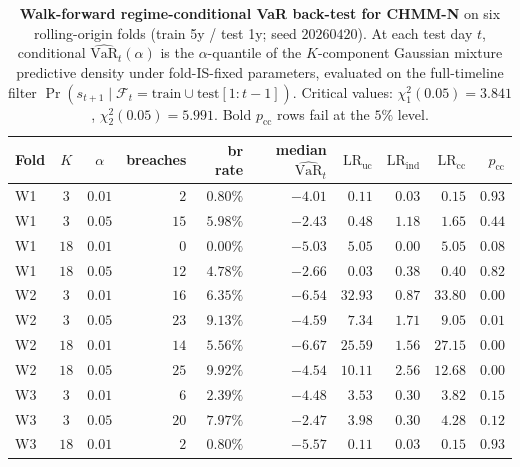 \begin{table}[!ht]
\centering
\small
\caption{\textbf{Walk-forward regime-conditional VaR back-test for CHMM-N} on six rolling-origin folds (train 5y / test 1y; seed $20260420$). At each test day $t$, conditional $\widehat{\text{VaR}}_t(\alpha)$ is the $\alpha$-quantile of the $K$-component Gaussian mixture predictive density under fold-IS-fixed parameters, evaluated on the full-timeline filter $\Pr(s_{t+1} \mid \mathcal F_t = \text{train} \cup \text{test}[1{:}t-1])$. Critical values: $\chi^2_1(0.05) = 3.841$, $\chi^2_2(0.05) = 5.991$. Bold $p_{\text{cc}}$ rows fail at the $5\%$ level.}
\label{tab:walkforward_cond_var}
\begin{tabular}{l c c r r r r r r r}
\toprule
Fold & $K$ & $\alpha$ & breaches & br rate & median $\widehat{\text{VaR}}_t$ & $\text{LR}_{\text{uc}}$ & $\text{LR}_{\text{ind}}$ & $\text{LR}_{\text{cc}}$ & $p_{\text{cc}}$ \\
\midrule
W1 & $3$  & $0.01$ & $\phantom{0}2$ & $0.80\%$ & $-4.01$ & $\phantom{0}0.11$ & $0.03$ & $\phantom{0}0.15$ & $0.93$ \\
W1 & $3$  & $0.05$ & $15$           & $5.98\%$ & $-2.43$ & $\phantom{0}0.48$ & $1.18$ & $\phantom{0}1.65$ & $0.44$ \\
W1 & $18$ & $0.01$ & $\phantom{0}0$ & $0.00\%$ & $-5.03$ & $\phantom{0}5.05$ & $0.00$ & $\phantom{0}5.05$ & $0.08$ \\
W1 & $18$ & $0.05$ & $12$           & $4.78\%$ & $-2.66$ & $\phantom{0}0.03$ & $0.38$ & $\phantom{0}0.40$ & $0.82$ \\
W2 & $3$  & $0.01$ & $16$           & $6.35\%$ & $-6.54$ & $32.93$ & $0.87$ & $33.80$ & $\mathbf{0.00}$ \\
W2 & $3$  & $0.05$ & $23$           & $9.13\%$ & $-4.59$ & $\phantom{0}7.34$ & $1.71$ & $\phantom{0}9.05$ & $\mathbf{0.01}$ \\
W2 & $18$ & $0.01$ & $14$           & $5.56\%$ & $-6.67$ & $25.59$ & $1.56$ & $27.15$ & $\mathbf{0.00}$ \\
W2 & $18$ & $0.05$ & $25$           & $9.92\%$ & $-4.54$ & $10.11$ & $2.56$ & $12.68$ & $\mathbf{0.00}$ \\
W3 & $3$  & $0.01$ & $\phantom{0}6$ & $2.39\%$ & $-4.48$ & $\phantom{0}3.53$ & $0.30$ & $\phantom{0}3.82$ & $0.15$ \\
W3 & $3$  & $0.05$ & $20$           & $7.97\%$ & $-2.47$ & $\phantom{0}3.98$ & $0.30$ & $\phantom{0}4.28$ & $0.12$ \\
W3 & $18$ & $0.01$ & $\phantom{0}2$ & $0.80\%$ & $-5.57$ & $\phantom{0}0.11$ & $0.03$ & $\phantom{0}0.15$ & $0.93$ \\

\end{tabular}
\end{table}
